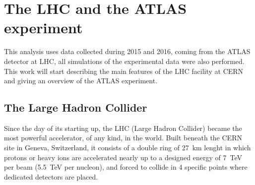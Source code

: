 
\chapter{The LHC and the ATLAS experiment}
\lettrine{T}{}his analysis uses data collected during 2015 and 2016, coming from the ATLAS detector at LHC, all simulations of the experimental data were also performed. This work will start describing the main features of the LHC facility at CERN and giving an overview of the ATLAS experiment. 

\section{The Large Hadron Collider}
Since the day of its starting up, the LHC (Large Hadron Collider) became the most powerful accelerator, of any kind, in the world. Built beneath the CERN site in Geneva, Switzerland, it consists of a double ring of \SI{27}{\km} lenght in which protons or heavy ions are accelerated nearly up to a designed energy of \SI{7}{\TeV} per beam (\SI{5.5}{\TeV} per nucleon), and forced to collide in 4 specific points where dedicated detectors are placed.

